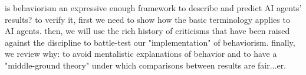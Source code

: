 \documentclass[letterpaper,11pt,twocolumn]{article}
\begin{document}
is behaviorism an expressive enough framework to describe and predict AI agents' results?
to verify it, first we need to show how the basic terminology applies to AI agents. then, we will use the rich history of criticisms that have been raised against the discipline to battle-test our "implementation" of behaviorism. finally, we review why: to avoid mentalistic explanations of behavior and to have a "middle-ground theory" under which comparisons between results are fair...er.

\printbibliography
\end{document}
